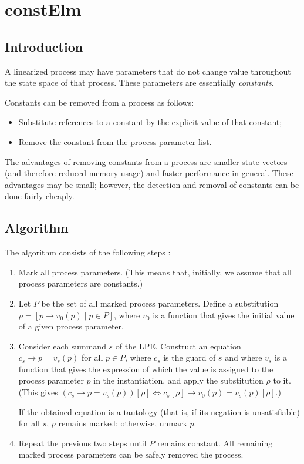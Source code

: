 \chapter{constElm}

\section{Introduction}

A linearized process may have parameters that do not change value throughout the state space of that process.
These parameters are essentially \emph{constants}.

Constants can be removed from a process as follows:
\begin{itemize}
\item Substitute references to a constant by the explicit value of that constant;
\item Remove the constant from the process parameter list.
\end{itemize}

The advantages of removing constants from a process are smaller state vectors (and therefore reduced memory usage) and faster performance in general.
These advantages may be small; however, the detection and removal of constants can be done fairly cheaply.

\section{Algorithm}

The algorithm consists of the following steps \cite{groote2001computer}:

\begin{enumerate}

\item Mark all process parameters.
(This means that, initially, we assume that all process parameters are constants.)

\item Let $P$ be the set of all marked process parameters.
Define a substitution $\rho = [p \rightarrow v_0(p) \;|\; p \in P]$, where $v_0$ is a function that gives the initial value of a given process parameter.

\item Consider each summand $s$ of the LPE.
Construct an equation $c_s \rightarrow p = v_s(p)$ for all $p \in P$, where $c_s$ is the guard of $s$ and where $v_s$ is a function that gives the expression of which the value is assigned to the process parameter $p$ in the instantiation, and apply the substitution $\rho$ to it.
(This gives $(c_s \rightarrow p = v_s(p))[\rho] \Leftrightarrow {c_s}[\rho] \rightarrow v_0(p) = v_s(p)[\rho]$.)

If the obtained equation is a tautology (that is, if its negation is unsatisfiable) for all $s$, $p$ remains marked; otherwise, unmark $p$.

\item Repeat the previous two steps until $P$ remains constant.
All remaining marked process parameters can be safely removed the process.

\end{enumerate}

